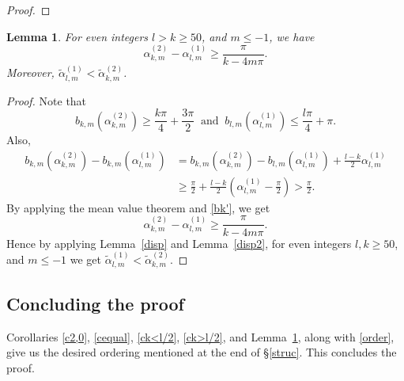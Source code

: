 \documentclass[12pt,reqno]{amsart}
\newtheorem{lem}{Lemma}
\newcommand{\lemref}[1]{Lemma~\ref{#1}}
\begin{document}
\begin{proof}
 
% 
%
%
%
%
%

\end{proof}


\begin{lem}\label{2nd zero}
For even integers $l>k\ge50$, and $m\le -1$, we have 
$$
{\alpha}_{k,m}^{(2)}-{\alpha}_{l,m}^{(1)}\ge\frac{\pi}{k-4m\pi}.
$$
Moreover, $\tilde{\alpha}_{l,m}^{(1)}<\tilde{\alpha}_{k,m}^{(2)}$.
\end{lem}
\begin{proof}
Note that
$$
b_{k,m}({\alpha}_{k,m}^{(2)})\ge\frac{k\pi}{4}+\frac{3\pi}{2}
\ \text{ and } \
b_{l,m}({\alpha}_{l,m}^{(1)})\le\frac{l\pi}{4}+\pi.
$$
Also,
\begin{align*}
    b_{k,m}({\alpha}_{k,m}^{(2)})-b_{k,m}({\alpha}_{l,m}^{(1)})&=b_{k,m}({\alpha}_{k,m}^{(2)})-b_{l,m}({\alpha}_{l,m}^{(1)})+\frac{l-k}{2}{\alpha}_{l,m}^{(1)}\\
&\ge\frac{\pi}{2}+\frac{l-k}{2}\left({\alpha}_{l,m}^{(1)}-\frac{\pi}{2}\right)>\frac{\pi}{2}.
\end{align*}
By applying the mean value theorem and \eqref{bk'}, we get
$$
{\alpha}_{k,m}^{(2)}-{\alpha}_{l,m}^{(1)}\ge\frac{\pi}{k-4m\pi}.
$$
Hence by applying \lemref{disp} and \lemref{disp2}, for even integers $l,k\ge 50$, and $m\le-1$ we get
$
\tilde{\alpha}_{l,m}^{(1)}<\tilde{\alpha}_{k,m}^{(2)}$.
\end{proof}
\subsection{Concluding the proof} Corollaries \ref{c2,0}, \ref{cequal}, \ref{ck<l/2}, \ref{ck>l/2}, and \lemref{2nd zero}, along with \eqref{order}, give us the desired ordering mentioned at the end of \S\ref{struc}. This concludes the proof.
\end{document}
